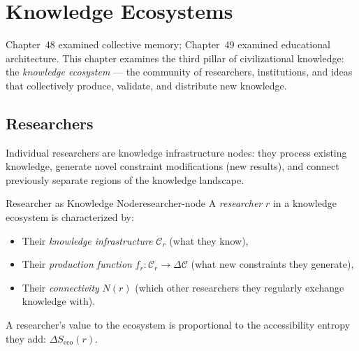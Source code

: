 \chapter{Knowledge Ecosystems}



Chapter~48 examined collective memory; Chapter~49 examined educational
architecture. This chapter examines the third pillar of civilizational
knowledge: the \emph{knowledge ecosystem} — the community of researchers,
institutions, and ideas that collectively produce, validate, and distribute
new knowledge.

\section{Researchers}

Individual researchers are knowledge infrastructure nodes: they process
existing knowledge, generate novel constraint modifications (new results),
and connect previously separate regions of the knowledge landscape.

\begin{definition}{Researcher as Knowledge Node}{researcher-node}
  A \emph{researcher} $r$ in a knowledge ecosystem is characterized by:
  \begin{itemize}
    \item Their \emph{knowledge infrastructure} $\mathcal{C}_r$
          (what they know),
    \item Their \emph{production function} $f_r : \mathcal{C}_r \to
          \Delta\mathcal{C}$ (what new constraints they generate),
    \item Their \emph{connectivity} $N(r)$ (which other researchers
          they regularly exchange knowledge with).
  \end{itemize}
  A researcher's value to the ecosystem is proportional to the
  accessibility entropy they add: $\Delta S_\text{eco}(r)$.
\end{definition}

